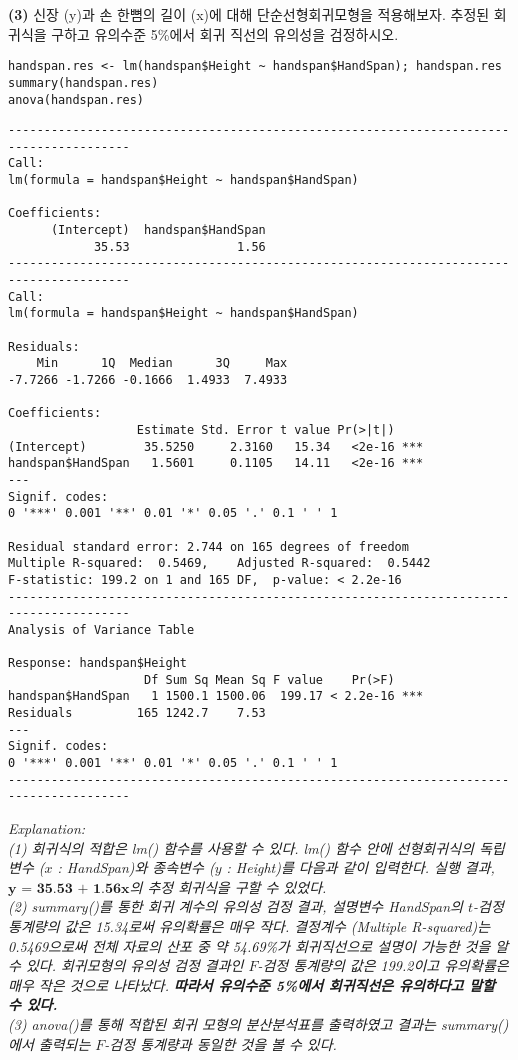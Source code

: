 \documentclass{article}
\begin{document}
\textbf{(3)} 신장 (y)과 손 한뼘의 길이 (x)에 대해 단순선형회귀모형을 적용해보자. 추정된 회귀식을 구하고 유의수준 5\%에서 회귀 직선의 유의성을 검정하시오.

\begin{lstlisting}[style={r-style}]
handspan.res <- lm(handspan$Height ~ handspan$HandSpan); handspan.res
summary(handspan.res)
anova(handspan.res)
\end{lstlisting}
\begin{lstlisting}[style={out-style}]
---------------------------------------------------------------------------------------
Call:
lm(formula = handspan$Height ~ handspan$HandSpan)

Coefficients:
      (Intercept)  handspan$HandSpan  
            35.53               1.56  
---------------------------------------------------------------------------------------
Call:
lm(formula = handspan$Height ~ handspan$HandSpan)

Residuals:
    Min      1Q  Median      3Q     Max 
-7.7266 -1.7266 -0.1666  1.4933  7.4933 

Coefficients:
                  Estimate Std. Error t value Pr(>|t|)    
(Intercept)        35.5250     2.3160   15.34   <2e-16 ***
handspan$HandSpan   1.5601     0.1105   14.11   <2e-16 ***
---
Signif. codes:  
0 '***' 0.001 '**' 0.01 '*' 0.05 '.' 0.1 ' ' 1

Residual standard error: 2.744 on 165 degrees of freedom
Multiple R-squared:  0.5469,	Adjusted R-squared:  0.5442 
F-statistic: 199.2 on 1 and 165 DF,  p-value: < 2.2e-16
---------------------------------------------------------------------------------------
Analysis of Variance Table

Response: handspan$Height
                   Df Sum Sq Mean Sq F value    Pr(>F)    
handspan$HandSpan   1 1500.1 1500.06  199.17 < 2.2e-16 ***
Residuals         165 1242.7    7.53                      
---
Signif. codes:  
0 '***' 0.001 '**' 0.01 '*' 0.05 '.' 0.1 ' ' 1
---------------------------------------------------------------------------------------
\end{lstlisting}
\emph{Explanation: \\
(1) 회귀식의 적합은 lm() 함수를 사용할 수 있다. lm() 함수 안에 선형회귀식의 독립변수 ($x$ : HandSpan)와 종속변수 ($y$ : Height)를 다음과 같이 입력한다. 실행 결과, $\textbf{y = 35.53 + 1.56x}$의 추정 회귀식을 구할 수 있었다. \\
(2) summary()를 통한 회귀 계수의 유의성
검정 결과, 설명변수 HandSpan의 $t$-검정 통계량의 값은 15.34로써 유의확률은 매우 작다. 
결정계수 (Multiple R-squared)는 0.5469으로써 전체 자료의 산포 중 약 54.69\%가 회귀직선으로 설명이 가능한 것을 알 수 있다. 
회귀모형의 유의성 검정 결과인 $F$-검정 통계량의 값은
199.2이고 유의확률은 매우 작은 것으로 나타났다. \textbf{따라서 유의수준 5\%에서 회귀직선은 유의하다고 말할 수 있다.}  \\
(3) anova()를 통해 적합된 회귀 모형의 분산분석표를 출력하였고 결과는 summary()에서 출력되는 $F$-검정 통계량과 동일한 것을 볼 수 있다.} \\
\end{document}
